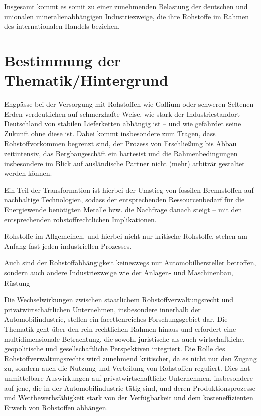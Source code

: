 \documentclass[12pt,a4paper,oneside]{book} %
\begin{document}
	Insgesamt kommt es somit zu einer zunehmenden Belastung der deutschen und unionalen mineralienabhängigen Industriezweige, die ihre Rohstoffe im Rahmen des internationalen Handels beziehen.
	
	
	\section{Bestimmung der Thematik/Hintergrund}
	Engpässe bei der Versorgung mit Rohstoffen wie Gallium oder schweren Seltenen Erden verdeutlichen auf schmerzhafte Weise, wie stark der Industriestandort Deutschland von stabilen Lieferketten abhängig ist – und wie gefährdet seine Zukunft ohne diese ist. Dabei kommt insbesondere zum Tragen, dass Rohstoffvorkommen begrenzt sind, der Prozess von Erschließung bis Abbau zeitintensiv, das Bergbaugeschäft ein \glqq hartes\grqq ist und die Rahmenbedingungen insbesondere im Blick auf ausländische Partner nicht (mehr) arbiträr gestaltet werden können.
	
	Ein Teil der Transformation ist hierbei der Umstieg von fossilen Brennstoffen auf nachhaltige Technologien, sodass der entsprechenden Ressourcenbedarf für die Energiewende benötigten Metalle bzw. die Nachfrage danach steigt\autocite{Driving factors for responsible sourcing in Europe: Motivations of renewable energy technology manufacturers} -- mit den entsprechenden rohstoffrechtlichen Implikationen.
	
	Rohstoffe im Allgemeinen, und hierbei nicht nur kritische Rohstoffe, stehen am Anfang fast jeden industriellen Prozesses.
	
	Auch sind der Rohstoffabhängigkeit keineswegs nur Automobilhersteller betroffen, sondern auch andere Industriezweige wie der Anlagen- und Maschinenbau, Rüstung
	
	Die Wechselwirkungen zwischen staatlichem Rohstoffverwaltungsrecht und privatwirtschaftlichen Unternehmen, insbesondere innerhalb der Automobilindustrie, stellen ein facettenreiches Forschungsgebiet dar. Die Thematik geht über den rein rechtlichen Rahmen hinaus und erfordert eine multidimensionale Betrachtung, die sowohl juristische als auch wirtschaftliche, geopolitische und gesellschaftliche Perspektiven integriert. Die Rolle des Rohstoffverwaltungsrechts wird zunehmend kritischer, da es nicht nur den Zugang zu, sondern auch die Nutzung und Verteilung von Rohstoffen reguliert. Dies hat unmittelbare Auswirkungen auf privatwirtschaftliche Unternehmen, insbesondere auf jene, die in der Automobilindustrie tätig sind, und deren Produktionsprozesse und Wettbewerbsfähigkeit stark von der Verfügbarkeit und dem kosteneffizienten Erwerb von Rohstoffen abhängen.
	
\end{document}
